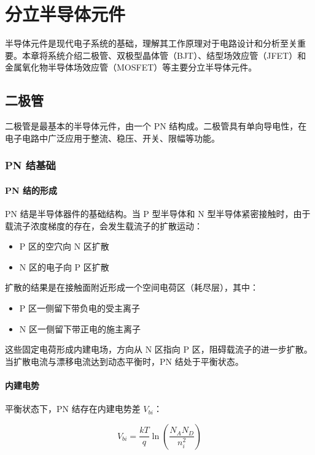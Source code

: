 \chapter{分立半导体元件}

半导体元件是现代电子系统的基础，理解其工作原理对于电路设计和分析至关重要。本章将系统介绍二极管、双极型晶体管（BJT）、结型场效应管（JFET）和金属氧化物半导体场效应管（MOSFET）等主要分立半导体元件。

\section{二极管}

二极管是最基本的半导体元件，由一个 PN 结构成。二极管具有单向导电性，在电子电路中广泛应用于整流、稳压、开关、限幅等功能。

\subsection{PN 结基础}

\subsubsection{PN 结的形成}

PN 结是半导体器件的基础结构。当 P 型半导体和 N 型半导体紧密接触时，由于载流子浓度梯度的存在，会发生载流子的扩散运动：

\begin{itemize}
  \item P 区的空穴向 N 区扩散
  \item N 区的电子向 P 区扩散
\end{itemize}

扩散的结果是在接触面附近形成一个空间电荷区（耗尽层），其中：
\begin{itemize}
  \item P 区一侧留下带负电的受主离子
  \item N 区一侧留下带正电的施主离子
\end{itemize}

这些固定电荷形成内建电场，方向从 N 区指向 P 区，阻碍载流子的进一步扩散。当扩散电流与漂移电流达到动态平衡时，PN 结处于平衡状态。

\subsubsection{内建电势}

平衡状态下，PN 结存在内建电势差 $V_{bi}$：

\begin{equation}
V_{bi} = \frac{kT}{q} \ln\left(\frac{N_A N_D}{n_i^2}\right) \label{eq:built-in-potential}
\end{equation}

